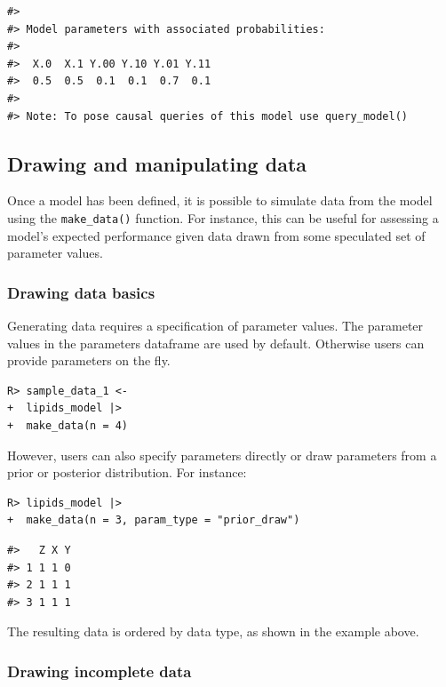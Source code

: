 \documentclass[
  11pt,
  article]{jss}
\begin{document}
\begin{verbatim}
#> 
#> Model parameters with associated probabilities: 
#> 
#>  X.0  X.1 Y.00 Y.10 Y.01 Y.11 
#>  0.5  0.5  0.1  0.1  0.7  0.1 
#> 
#> Note: To pose causal queries of this model use query_model()
\end{verbatim}

\subsection{Drawing and manipulating
data}\label{drawing-and-manipulating-data}

Once a model has been defined, it is possible to simulate data from the
model using the \texttt{make\_data()} function. For instance, this can
be useful for assessing a model's expected performance given data drawn
from some speculated set of parameter values.

\subsubsection{Drawing data basics}\label{drawing-data-basics}

Generating data requires a specification of parameter values. The
parameter values in the parameters dataframe are used by default.
Otherwise users can provide parameters on the fly.

\begin{verbatim}
R> sample_data_1 <- 
+  lipids_model |> 
+  make_data(n = 4)
\end{verbatim}

However, users can also specify parameters directly or draw parameters
from a prior or posterior distribution. For instance:

\begin{verbatim}
R> lipids_model |>
+  make_data(n = 3, param_type = "prior_draw")
\end{verbatim}

\begin{verbatim}
#>   Z X Y
#> 1 1 1 0
#> 2 1 1 1
#> 3 1 1 1
\end{verbatim}

The resulting data is ordered by data type, as shown in the example
above.

\subsubsection{Drawing incomplete data}\label{drawing-incomplete-data}
\end{document}

